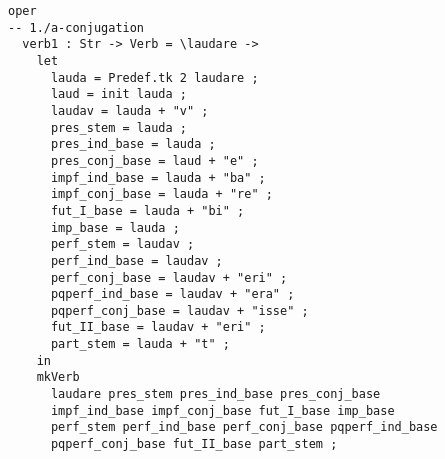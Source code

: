 \begin{lstlisting}[float=h!tp,caption={Bildung der Wortstämme und -stöcke für Verben der ersten Konjugation (vgl. \textbf{MorphoLat.gf})},label={GF-Morpho-Verb1},basicstyle=\small]
oper
-- 1./a-conjugation
  verb1 : Str -> Verb = \laudare ->
    let
      lauda = Predef.tk 2 laudare ;
      laud = init lauda ;
      laudav = lauda + "v" ;
      pres_stem = lauda ;
      pres_ind_base = lauda ;
      pres_conj_base = laud + "e" ;
      impf_ind_base = lauda + "ba" ;
      impf_conj_base = lauda + "re" ;
      fut_I_base = lauda + "bi" ;
      imp_base = lauda ;
      perf_stem = laudav ;
      perf_ind_base = laudav ;
      perf_conj_base = laudav + "eri" ;
      pqperf_ind_base = laudav + "era" ;
      pqperf_conj_base = laudav + "isse" ;
      fut_II_base = laudav + "eri" ;
      part_stem = lauda + "t" ;
    in
    mkVerb 
      laudare pres_stem pres_ind_base pres_conj_base 
      impf_ind_base impf_conj_base fut_I_base imp_base
      perf_stem perf_ind_base perf_conj_base pqperf_ind_base 
      pqperf_conj_base fut_II_base part_stem ;
\end{lstlisting}

